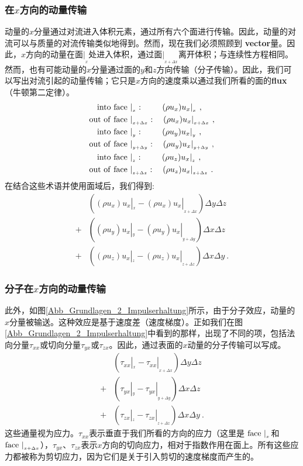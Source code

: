 \documentclass[LBMDerivation.tex]{subfiles}
\begin{document}
\subsubsection{在$x$方向的动量传输}
%
%
%
 动量的$x$分量通过对流进入体积元素，通过所有六个面进行传输。因此，动量的对流可以与质量的对流传输类似地得到。然而，现在我们必须照顾到 \textbf{vector}量。因此，$x$方向的动量在面$|_{_x}$处进入体积，通过面$|_{_{x+\Delta x}}$离开体积；与连续性方程相同。然而，也有可能动量的$x$分量通过面的$y$和$z$方向传输（分子传输）。因此，我们可以写出对流引起的动量传输；它只是$x$方向的速度乘以通过我们所看的面的\textbf{flux}（牛顿第二定律）。
%
%
\begin{align*}
 \mathrm{into~face~}&|_{_x}: ~~~~~~~
 (\rho u_x)u_x|_{_x} ~, \\
 \mathrm{out~of~face~}&|_{_{x+\Delta x}}: ~~~
 (\rho u_x)u_x |_{_{x+\Delta x}} ~,
 \\
 \mathrm{into~face~}&|_{_y} : ~~~~~~~
 (\rho u_y)u_x |_{_y} ~, \\
 \mathrm{out~of~face~}&|_{_{y+\Delta y}} : ~~~
 (\rho u_y)u_x |_{_{y+\Delta y}} ~,
 \\
 \mathrm{into~face~}&|_{_z} : ~~~~~~~
 (\rho u_z)u_x |_{_z} ~, \\
 \mathrm{out~of~face~}&|_{_{z+\Delta z}} : ~~~
 (\rho u_z)u_x |_{_{z+\Delta z}} ~.
\end{align*}
%
%
	在结合这些术语并使用面域后，我们得到:
%
%
\begin{align*}
  &\left(
    (\rho u_x)u_x |_{_x} - (\rho u_x)u_x |_{_{x+\Delta x}}
  \right)
  \Delta y \Delta z \\
  +&\left(
    (\rho u_y)u_x |_{_y} - (\rho u_y)u_x |_{_{y+\Delta y}}
  \right)
  \Delta x \Delta z  \\
  +&\left(
    (\rho u_z)u_x |_{_z} - (\rho u_z)u_x |_{_{z+\Delta z}}
  \right)
  \Delta x \Delta y ~.
\end{align*}
%
%
%
%
\subsubsection{分子在$x$方向的动量传输}
%
%
%
%
	此外，如图\ref{Abb_Grundlagen_2_Impulserhaltung}所示，由于分子效应，动量的$x$分量被输送。这种效应是基于速度差（速度梯度）。正如我们在图\ref{Abb_Grundlagen_2_Impulserhaltung}中看到的那样，出现了不同的项，包括法向分量$\tau_{xx}$或切向分量$\tau_{yx}$或$\tau_{zx}$。因此，通过表面的$x$动量的分子传输可以写成。
%
%
\begin{align*}
  &\left(
    \tau_{xx} |_{_x} - \tau_{xx} |_{_{x+\Delta x}}
  \right)
  \Delta y \Delta z \\
  +&\left(
    \tau_{yx} |_{_y} - \tau_{yx} |_{_{y+\Delta y}}
  \right)
  \Delta x \Delta z \\
  +&\left(
    \tau_{zx} |_{_z} - \tau_{zx} |_{_{z+\Delta z}}
  \right)
  \Delta x \Delta y ~.
\end{align*}
%
%
这些通量视为应力。$\tau_{xx}$表示垂直于我们所看的方向的应力（这里是 $\mathrm{face}~|_{_x}$和$\mathrm{face}~|_{_{x+\Delta x}}$），$\tau_{yx}$、$\tau_{zx}$表示$x$方向的切向应力，相对于指数作用在面上。所有这些应力都被称为剪切应力，因为它们是关于引入剪切的速度梯度而产生的。
%
%
%
%
\end{document}
